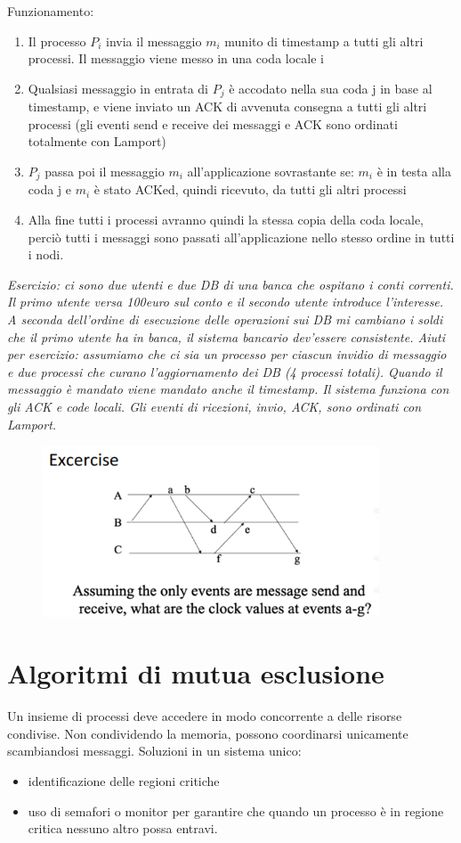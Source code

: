 \documentclass[12pt,italian]{report}
\begin{document}
\bigbreak 
Funzionamento:
\begin{enumerate}
    \item Il processo $P_i$ invia il messaggio $m_i$ munito di timestamp a tutti gli altri processi. Il messaggio viene messo in una coda locale i
    \item Qualsiasi messaggio in entrata di $P_j$ è accodato nella sua coda j in base al timestamp, e viene inviato un ACK di avvenuta consegna a tutti gli altri processi (gli eventi send e receive dei messaggi e ACK sono ordinati totalmente con Lamport)
    \item $P_j$ passa poi il messaggio $m_i$ all'applicazione sovrastante se: $m_i$ è in testa alla coda j e $m_i$ è stato ACKed, quindi ricevuto, da tutti gli altri processi
    \item Alla fine tutti i processi avranno quindi la stessa copia della coda locale, perciò tutti i messaggi sono passati all'applicazione nello stesso ordine in tutti i nodi. 
\end{enumerate}

\textit{Esercizio: ci sono due utenti e due DB di una banca che ospitano i conti correnti. Il primo utente versa 100euro sul conto e il secondo utente introduce l’interesse. A seconda dell’ordine di esecuzione delle operazioni sui DB mi cambiano i soldi che il primo utente ha in banca, il sistema bancario dev’essere consistente.
\bigbreak
Aiuti per esercizio: assumiamo che ci sia un processo per ciascun invidio di messaggio e due processi che curano l’aggiornamento dei DB (4 processi totali). Quando il messaggio è mandato viene mandato anche il timestamp. Il sistema funziona con gli ACK e code locali. Gli eventi di ricezioni, invio, ACK, sono ordinati con Lamport.}

\begin{figure}[h]
\centering
\includegraphics[width=100mm]{img/exla2.png}
\end{figure}

\section{Algoritmi di mutua esclusione}
Un insieme di processi deve accedere in modo concorrente a delle risorse condivise. Non condividendo la memoria, possono coordinarsi unicamente scambiandosi messaggi.
\bigbreak
\noindent Soluzioni in un sistema unico:
\begin{itemize}
    \item identificazione delle regioni critiche 
    \item uso di semafori o monitor per garantire che quando un processo è in regione critica nessuno altro possa entravi.
\end{itemize}
\bigbreak
\end{document}

